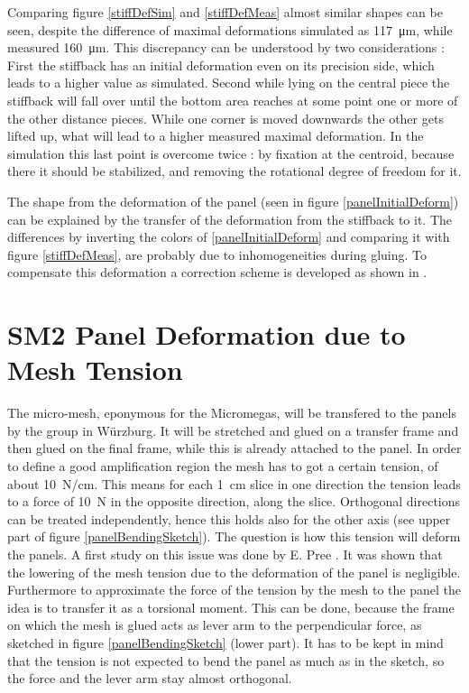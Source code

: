 \documentclass[
a4paper,                                %
twoside,                                %
BCOR1.4cm,                      %
10pt,                           %
headings=normal,                %
headsepline,                    %
clearplainpage, %
final,                                  %
div=14,
parskip=full,
openright,
bibliography=toc
]{scrreprt}
\begin{document}
Comparing figure \ref{stiffDefSim} and \ref{stiffDefMeas} almost similar shapes can be seen, despite the difference of maximal deformations simulated as \SI{117}{\micro\m}, while measured \SI{160}{\micro\m}. This discrepancy can be understood by two considerations : First the stiffback has an initial deformation even on its precision side, which leads to a higher value as simulated. Second while lying on the central piece the stiffback will fall over until the bottom area reaches at some point one or more of the other distance pieces. While one corner is moved downwards the other gets lifted up, what will lead to a higher measured maximal deformation. In the simulation this last point is overcome twice : by fixation at the centroid, because there it should be stabilized, and removing the rotational degree of freedom for it. 

The shape from the deformation of the panel (seen in figure \ref{panelInitialDeform}) can be explained by the transfer of the deformation from the stiffback to it. The differences by inverting the colors of \ref{panelInitialDeform} and comparing it with figure \ref{stiffDefMeas}, are probably due to inhomogeneities during gluing. To compensate this deformation a correction scheme is developed as shown in \cite{ralphMthesis}.

\section{SM2 Panel Deformation due to Mesh Tension}

The micro-mesh, eponymous for the Micromegas, will be transfered to the panels by the group in W\"urzburg. It will be stretched and glued on a transfer frame and then glued on the final frame, while this is already attached to the panel. In order to define a good amplification region the mesh has to got a certain tension, of about \SI{10}{\N/\cm}. This means for each \SI{1}{cm} slice in one direction the tension leads to a force of \SI{10}{\N} in the opposite direction, along the slice. Orthogonal directions can be treated independently, hence this holds also for the other axis (see upper part of figure \ref{panelBendingSketch}). The question is how this tension will deform the panels. A first study on this issue was done by E. Pree \cite{elias}. It was shown that the lowering of the mesh tension due to the deformation of the panel is negligible. Furthermore to approximate the force of the tension by the mesh to the panel the idea is to transfer it as a torsional moment. This can be done, because the frame on which the mesh is glued acts as lever arm to the perpendicular force, as sketched in figure \ref{panelBendingSketch} (lower part). It has to be kept in mind that the tension is not expected to bend the panel as much as in the sketch, so the force and the lever arm stay almost orthogonal.  
\end{document}
